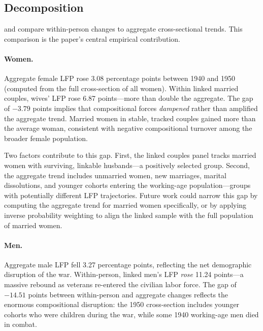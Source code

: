 \documentclass[12pt]{article}
\begin{document}


\subsection{Decomposition}

 and  compare within-person changes to aggregate cross-sectional trends. This comparison is the paper's central empirical contribution.

\paragraph{Women.} Aggregate female LFP rose 3.08 percentage points between 1940 and 1950 (computed from the full cross-section of all women). Within linked married couples, wives' LFP rose 6.87 points---more than double the aggregate. The gap of $-3.79$ points implies that compositional forces \textit{dampened} rather than amplified the aggregate trend. Married women in stable, tracked couples gained more than the average woman, consistent with negative compositional turnover among the broader female population.

Two factors contribute to this gap. First, the linked couples panel tracks married women with surviving, linkable husbands---a positively selected group. Second, the aggregate trend includes unmarried women, new marriages, marital dissolutions, and younger cohorts entering the working-age population---groups with potentially different LFP trajectories. Future work could narrow this gap by computing the aggregate trend for married women specifically, or by applying inverse probability weighting to align the linked sample with the full population of married women.

\paragraph{Men.} Aggregate male LFP fell 3.27 percentage points, reflecting the net demographic disruption of the war. Within-person, linked men's LFP \textit{rose} 11.24 points---a massive rebound as veterans re-entered the civilian labor force. The gap of $-14.51$ points between within-person and aggregate changes reflects the enormous compositional disruption: the 1950 cross-section includes younger cohorts who were children during the war, while some 1940 working-age men died in combat.
\end{document}
